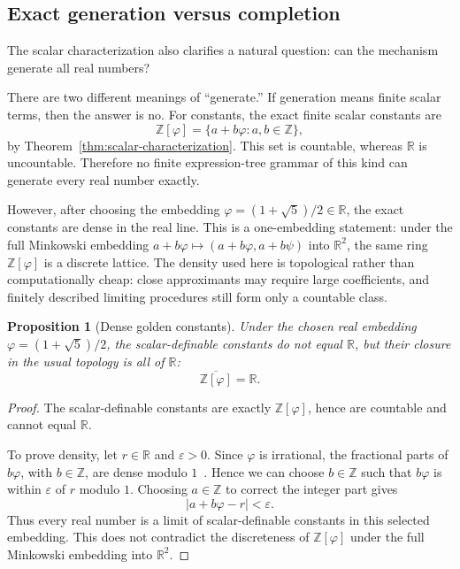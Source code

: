 \documentclass[11pt]{article}
\newtheorem{proposition}[definition]{Proposition}
\newcommand{\ph}{\varphi}
\newcommand{\ps}{\psi}
\newcommand{\Z}{\mathbb{Z}}
\newcommand{\R}{\mathbb{R}}
\begin{document}
\subsection{Exact generation versus completion}\label{subsec:completion}

The scalar characterization also clarifies a natural question: can the mechanism generate all real numbers?

There are two different meanings of ``generate.''  If generation means finite scalar terms, then the answer is no.  For constants, the exact finite scalar constants are
\[
    \Z[\ph]=\{a+b\ph:a,b\in\Z\},
\]
by Theorem~\ref{thm:scalar-characterization}.  This set is countable, whereas $\R$ is uncountable.  Therefore no finite expression-tree grammar of this kind can generate every real number exactly.

However, after choosing the embedding $\ph=(1+\sqrt5)/2\in\R$, the exact constants are dense in the real line.  This is a one-embedding statement: under the full Minkowski embedding $a+b\ph\mapsto(a+b\ph,a+b\ps)$ into $\R^2$, the same ring $\Z[\ph]$ is a discrete lattice.  The density used here is topological rather than computationally cheap: close approximants may require large coefficients, and finitely described limiting procedures still form only a countable class.

\begin{proposition}[Dense golden constants]\label{prop:dense-golden-constants}
Under the chosen real embedding $\ph=(1+\sqrt5)/2$, the scalar-definable constants do not equal $\R$, but their closure in the usual topology is all of $\R$:
\[
    \overline{\Z[\ph]}=\R.
\]
\end{proposition}

\begin{proof}
The scalar-definable constants are exactly $\Z[\ph]$, hence are countable and cannot equal $\R$.

To prove density, let $r\in\R$ and $\varepsilon>0$.  Since $\ph$ is irrational, the fractional parts of $b\ph$, with $b\in\Z$, are dense modulo $1$~\cite{HardyWright2008}.  Hence we can choose $b\in\Z$ such that $b\ph$ is within $\varepsilon$ of $r$ modulo $1$.  Choosing $a\in\Z$ to correct the integer part gives
\[
    |a+b\ph-r|<\varepsilon.
\]
Thus every real number is a limit of scalar-definable constants in this selected embedding.  This does not contradict the discreteness of $\Z[\ph]$ under the full Minkowski embedding into $\R^2$.
\end{proof}
\end{document}
